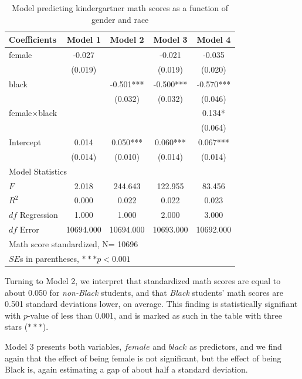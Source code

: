 \begin{table}[htbp]\centering
\caption{Model predicting kindergartner math scores as a function of gender and race
\label{tab:eclsinter}}
\begin{tabular}{lcccc}
\hline
Coefficients&Model 1&Model 2&Model 3&Model 4 \\
\hline
female   &   -0.027  &        &   -0.021  &   -0.035  \\
      &   (0.019)  &        &   (0.019)  &   (0.020)  \\
black    &        &   -0.501***&   -0.500***&   -0.570***\\
      &        &   (0.032)  &   (0.032)  &   (0.046)  \\
female$\times$black &        &        &        &    0.134* \\
      &        &        &        &   (0.064)  \\
Intercept    &    0.014  &    0.050***&    0.060***&    0.067***\\
      &   (0.014)  &   (0.010)  &   (0.014)  &   (0.014)  \\
\hline
\multicolumn{5}{l}{Model Statistics} \\
\hline
$F$ 							 &    2.018  &   244.643  &   122.955  &   83.456  \\
$R^2$ 						 &    0.000  &    0.022  &    0.022  &    0.023  \\
$df$ Regression 			 &    1.000  &    1.000  &    2.000  &    3.000  \\
$df$ Error 					 &  10694.000  &  10694.000  &  10693.000  &  10692.000  \\
\hline
\multicolumn{5}{l}{Math score standardized, N= 10696} \\
\multicolumn{5}{l}{$SE$s in parentheses, $***p<0.001$}{\footnotesize{\emph{Source: ECLS-K}}} \\
\hline
\end{tabular}
\end{table}
Turning to Model 2, we interpret that standardized math scores are equal to about 0.050 for {\it non-Black} students, and that {\it Black} students' math scores are 0.501 standard deviations lower, on average. This finding is statistically signifiant with $p$-value of less than 0.001, and is marked as such in the table with three stars ($***$).

Model 3 presents both variables, $female$ and $black$ as predictors, and we find again that the effect of being female is not significant, but the effect of being Black is, again estimating a gap of about half a standard deviation.

